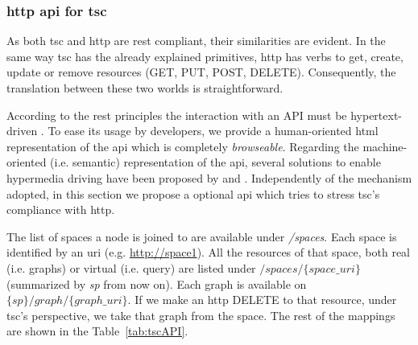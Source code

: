 \subsubsection{\acs{http} \acs{api} for \acs{tsc}}
\label{sec:httpapi}

As both \ac{tsc} and \ac{http} are \ac{rest} compliant, their similarities are evident.
In the same way \ac{tsc} has the already explained primitives, \ac{http} has verbs to get, create, update or remove resources (GET, PUT, POST, DELETE).
Consequently, the translation between these two worlds is straightforward.

\begin{sloppypar}
According to the \ac{rest} principles the interaction with an API must be hypertext-driven \citep{fielding_rest_2008}.
To ease its usage by developers, we provide a human-oriented \acs{html} representation of the \ac{api} which is completely \emph{browseable}.
Regarding the machine-oriented (i.e. semantic) representation of the \ac{api}, several solutions to enable hypermedia driving have been proposed by \citet{verborgh_functional_2012} and \citet{kjernsmo_necessity_2012}. %
Independently of the mechanism adopted, in this section we propose a optional \ac{api} which tries to stress \ac{tsc}'s compliance with \ac{http}.
\end{sloppypar}

The list of spaces a node is joined to are available under \textit{/spaces}.
Each space is identified by an \acs{uri} (e.g. \url{http://space1}).
All the resources of that space, both real (i.e. graphs) or virtual (i.e. query) are listed under $/spaces/\{space\_uri\}$ (summarized by \emph{sp} from now on).
Each graph is available on ${\{sp\}/graph/\{graph\_uri\}}$.
If we make an \acs{http} DELETE to that resource, under \ac{tsc}'s perspective, we take that graph from the space.
The rest of the mappings are shown in the Table~\ref{tab:tscAPI}.

